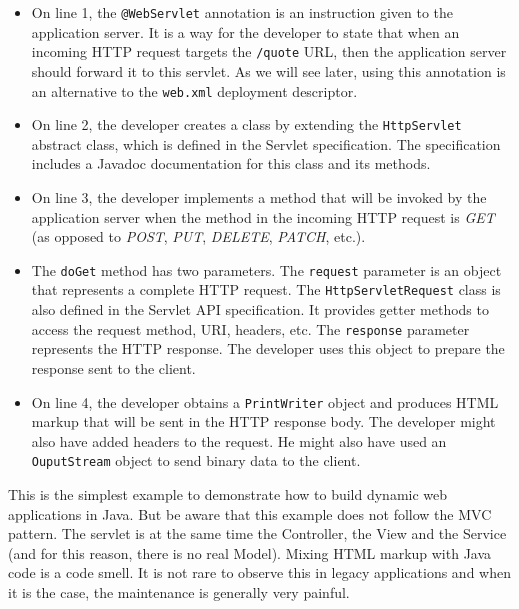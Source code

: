 \begin{itemize}
\item On line 1, the \texttt{@WebServlet} annotation is an instruction given to the application server. It is a way for the developer to state that when an incoming HTTP request targets the \texttt{/quote} URL, then the application server should forward it to this servlet. As we will see later, using this annotation is an alternative to the \texttt{web.xml} deployment descriptor.
\item On line 2, the developer creates a class by extending the \texttt{HttpServlet} abstract class, which is defined in the Servlet specification. The specification includes a Javadoc documentation for this class and its methods.
\item On line 3, the developer implements a method that will be invoked by the application server when the method in the incoming HTTP request is \emph{GET} (as opposed to \emph{POST}, \emph{PUT}, \emph{DELETE}, \emph{PATCH}, etc.).
\item The \texttt{doGet} method has two parameters. The \texttt{request} parameter is an object that represents a complete HTTP request. The \texttt{HttpServletRequest} class is also defined in the Servlet API specification. It provides getter methods to access the request method, URI, headers, etc. The \texttt{response} parameter represents the HTTP response. The developer uses this object to prepare the response sent to the client.
\item On line 4, the developer obtains a \texttt{PrintWriter} object and produces HTML markup that will be sent in the HTTP response body. The developer might also have added headers to the request. He might also have used an \texttt{OuputStream} object to send binary data to the client.
\end{itemize}

This is the simplest example to demonstrate how to build dynamic web applications in Java. But be aware that this example does not follow the \ac{MVC} pattern. The servlet is at the same time the Controller, the View and the Service (and for this reason, there is no real Model). Mixing HTML markup with Java code is a code smell. It is not rare to observe this in legacy applications and when it is the case, the maintenance is generally very painful.


